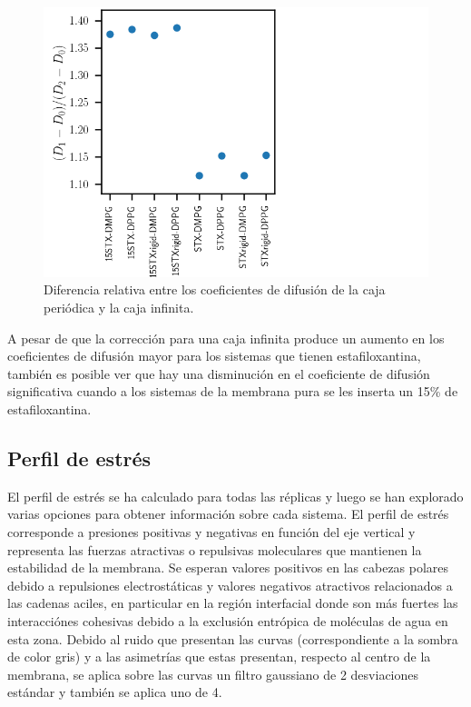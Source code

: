 \begin{figure}
\begin{center}
    \includegraphics[scale=0.35]{Plots/quotient.png}
  \caption{Diferencia relativa entre los coeficientes de difusi\'{o}n de la caja peri\'{o}dica y la caja infinita.}
  \label{fig:delta}
\end{center}
\end{figure}


A pesar de que la correcci\'{o}n para una caja infinita produce un aumento en los coeficientes de difusi\'{o}n mayor para los sistemas que tienen estafiloxantina, tambi\'{e}n es posible ver que hay una disminuci\'{o}n en el coeficiente de difusi\'{o}n significativa cuando a los sistemas de la membrana pura se les inserta un 15\% de estafiloxantina.\\

\subsection{Perfil de estr\'{e}s}
El perfil de estr\'{e}s se ha calculado para todas las r\'{e}plicas y luego se han explorado varias opciones para obtener informaci\'{o}n sobre cada sistema. El perfil de estr\'{e}s corresponde a presiones positivas y negativas en funci\'{o}n del eje vertical y representa las fuerzas atractivas o repulsivas moleculares que mantienen la estabilidad de la membrana. Se esperan valores positivos en las cabezas polares debido a repulsiones electrost\'{a}ticas y valores negativos atractivos relacionados a las cadenas aciles, en particular en la regi\'{o}n interfacial donde son m\'{a}s fuertes las interacci\'{o}nes cohesivas debido a la exclusi\'{o}n entr\'{o}pica de mol\'{e}culas de agua en esta zona. Debido al ruido que presentan las curvas (correspondiente a la sombra de color gris) y  a las asimetr\'{i}as que estas presentan, respecto al centro de la membrana, se aplica sobre las curvas un filtro gaussiano de 2 desviaciones est\'{a}ndar y tambi\'{e}n se aplica uno de 4.\\

